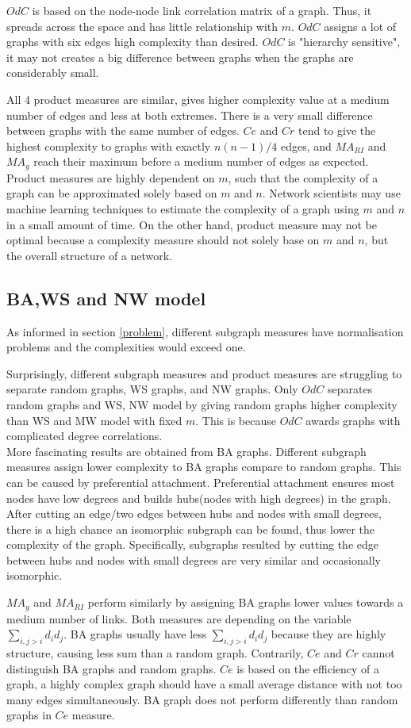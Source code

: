 \documentclass[12pt]{article}
\begin{document}
$OdC$ is based on the node-node link correlation matrix of a graph.\cite{odc} Thus, it spreads across the space and has little relationship with $m$. $OdC$ assigns a lot of graphs with six edges high complexity than desired. $OdC$ is "hierarchy sensitive", it may not creates a big difference between graphs when the graphs are considerably small.\par

All 4 product measures are similar, gives higher complexity value at a medium number of edges and less at both extremes. There is a very small difference between graphs with the same number of edges. $Ce$ and $Cr$ tend to give the highest complexity to graphs with exactly $n(n-1)/4$ edges, and $MA_{RI}$ and $MA_{g}$ reach their maximum before a medium number of edges as expected. Product measures are highly dependent on $m$, such that the complexity of a graph can be approximated solely based on $m$ and $n$. Network scientists may use machine learning techniques to estimate the complexity of a graph using $m$ and $n$ in a small amount of time. On the other hand, product measure may not be optimal because a complexity measure should not solely base on $m$ and $n$, but the overall structure of a network.


\subsection{BA,WS and NW model}
As informed in section \ref{problem}, different subgraph measures have normalisation problems and the complexities would exceed one.\par
Surprisingly, different subgraph measures and product measures are struggling to separate random graphs, WS graphs, and NW graphs. Only $OdC$ separates random graphs and WS, NW model by giving random graphs higher complexity than WS and MW model with fixed $m$. This is because $OdC$ awards graphs with complicated degree correlations.\\
More fascinating results are obtained from BA graphs. Different subgraph measures assign lower complexity to BA graphs compare to random graphs. This can be caused by preferential attachment. Preferential attachment ensures most nodes have low degrees and builds hubs(nodes with high degrees) in the graph. After cutting an edge/two edges between hubs and nodes with small degrees, there is a high chance an isomorphic subgraph can be found, thus lower the complexity of the graph. Specifically, subgraphs resulted by cutting the edge between hubs and nodes with small degrees are very similar and occasionally isomorphic.\par
$MA_g$ and $MA_{RI}$ perform similarly by assigning BA graphs lower values towards a medium number of links. Both measures are depending on the variable $\sum_{i,j>i}d_id_j$. BA graphs usually have less $\sum_{i,j>i}d_id_j$ because they are highly structure, causing less sum than a random graph. Contrarily, $Ce$ and $Cr$ cannot distinguish BA graphs and random graphs. $Ce$ is based on the efficiency of a graph, a highly complex graph should have a small average distance with not too many edges simultaneously. BA graph does not perform differently than random graphs in $Ce$ measure.\\
\end{document}
